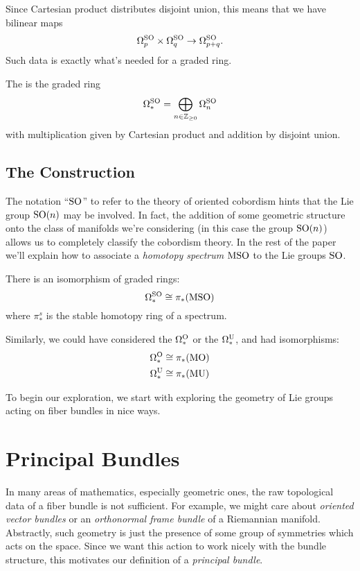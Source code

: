 \documentclass{article}
\begin{document}
Since Cartesian product distributes disjoint union, this means that we have bilinear maps
\[
  \Omega^{\mathrm{SO}}_p\times \Omega^{\mathrm{SO}}_q \to \Omega^{\mathrm{SO}}_{p+q}.
\]
Such data is exactly what's needed for a graded ring.

\begin{definition}
  The  is the graded ring
  \[
    \Omega^{\mathrm{SO}}_* = \bigoplus_{n\in \mathbb{Z}_{\geq 0}} \Omega^{\mathrm{SO}}_n
  \]
  with multiplication given by Cartesian product and addition by disjoint union.
\end{definition}

\subsection{The Construction}

The notation ``$\mathrm{SO}$'' to refer to the theory of oriented cobordism hints that the Lie group $\mathrm{SO}(n)$ may be involved. In fact, the addition of some geometric structure onto the class of manifolds we're considering (in this case the group $\mathrm{SO}(n)$) allows us to completely classify the cobordism theory. In the rest of the paper we'll explain how to associate a \emph{homotopy spectrum} $\mathrm{MSO}$ to the Lie groups $\mathrm{SO}$.

\begin{theorem}
  There is an isomorphism of graded rings:
  \[
    \Omega^{\mathrm{SO}}_* \cong \pi_*(\mathrm{MSO})
  \]
  where $\pi_*^s$ is the stable homotopy ring of a spectrum.
\end{theorem}

Similarly, we could have considered the  $\Omega^{\mathrm{O}}_*$ or the  $\Omega^{\mathrm{U}}_*$, and had isomorphisms:
\[
  \begin{aligned}
    \Omega^{\mathrm{O}}_* &\cong \pi_*(\mathrm{MO})\\
    \Omega^{\mathrm{U}}_* &\cong \pi_*(\mathrm{MU})
  \end{aligned}
\]

To begin our exploration, we start with exploring the geometry of Lie groups acting on fiber bundles in nice ways.

\section{Principal Bundles}

In many areas of mathematics, especially geometric ones, the raw topological data of a fiber bundle is not sufficient. For example, we might care about \emph{oriented vector bundles} or an \emph{orthonormal frame bundle} of a Riemannian manifold. Abstractly, such geometry is just the presence of some group of symmetries which acts on the space. Since we want this action to work nicely with the bundle structure, this motivates our definition of a \emph{principal bundle}.
\end{document}
